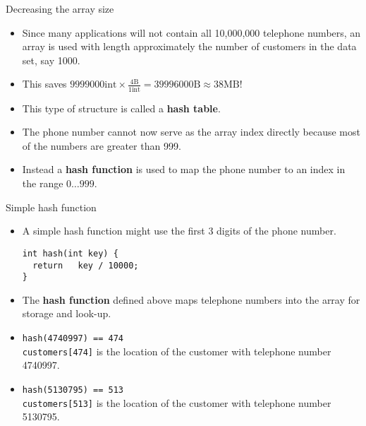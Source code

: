 \documentclass{beamer}
\begin{document}

\begin{frame}[fragile]{Decreasing the array size}

\begin{itemize}
\item Since many applications will not contain all 10,000,000 telephone numbers,
  an array is used with length approximately the number of customers
  in the data set, say 1000.  

\item This saves $9999000\text{int}\times\frac{4\text{B}}{1\text{int}}=39996000\text{B}\approx38\text{MB}$!

\item This type of structure  is called a \textbf{hash table}.

\item The phone number cannot now serve as the array index directly
  because most of the numbers are greater than 999.

\item Instead a \textbf{hash function} is used to map the phone number
  to an index in the range $0 \dots 999$.

\end{itemize}

\end{frame}


\begin{frame}[fragile]{Simple hash function}

\begin{itemize}
\item A simple hash function might use the first 3 digits of the phone number.

\begin{lstlisting}[numbers=none]
int hash(int key) {	
  return   key / 10000;	
}
\end{lstlisting}

\item The \textbf{hash function} defined above maps
  telephone numbers into the array for storage and look-up.

\item \lstinline$hash(4740997) == 474$ \\ \lstinline$customers[474]$ is
  the location of the customer with telephone number 4740997.

\item \lstinline$hash(5130795) == 513$ \\ \lstinline$customers[513]$ is
  the location of the customer with telephone number 5130795.

\end{itemize}

\end{frame}
\end{document}
